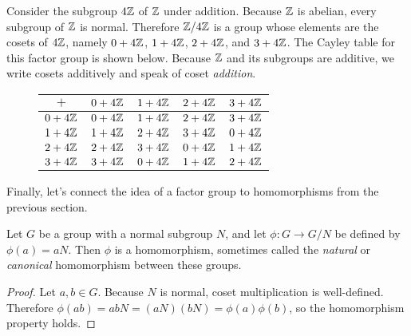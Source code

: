 \begin{example}
Consider the subgroup $4\mathbb{Z}$ of $\mathbb{Z}$ under addition. Because $\mathbb{Z}$ is abelian, every subgroup of $\mathbb{Z}$ is normal. Therefore $\mathbb{Z}/4\mathbb{Z}$ is a group whose elements are the cosets of $4\mathbb{Z}$, namely $0+4\mathbb{Z}$, $1+4\mathbb{Z}$, $2+4\mathbb{Z}$, and $3+4\mathbb{Z}$. The Cayley table for this factor group is shown below. Because $\mathbb{Z}$ and its subgroups are additive, we write cosets additively and speak of coset \textit{addition}.

\begin{figure}[ht]
\centering
\begin{tabular}{c | c c c c}
    $+$     & $0+4\mathbb{Z}$ & $1+4\mathbb{Z}$ & $2+4\mathbb{Z}$ & $3+4\mathbb{Z}$ \\
    \hline
    $0+4\mathbb{Z}$ & $0+4\mathbb{Z}$ & $1+4\mathbb{Z}$ & $2+4\mathbb{Z}$ & $3+4\mathbb{Z}$ \\
    $1+4\mathbb{Z}$ & $1+4\mathbb{Z}$ & $2+4\mathbb{Z}$ & $3+4\mathbb{Z}$ & $0+4\mathbb{Z}$ \\
    $2+4\mathbb{Z}$ & $2+4\mathbb{Z}$ & $3+4\mathbb{Z}$ & $0+4\mathbb{Z}$ & $1+4\mathbb{Z}$ \\
    $3+4\mathbb{Z}$ & $3+4\mathbb{Z}$ & $0+4\mathbb{Z}$ & $1+4\mathbb{Z}$ & $2+4\mathbb{Z}$
\end{tabular}
\caption{}
\end{figure}
\end{example}

Finally, let's connect the idea of a factor group to homomorphisms from the previous section.

\begin{theorem}
Let $G$ be a group with a normal subgroup $N$, and let $\phi: G \to G/N$ be defined by $\phi(a) = aN$. Then $\phi$ is a homomorphism, sometimes called the \textit{natural} or \textit{canonical} homomorphism between these groups.
\end{theorem}

\begin{proof}
Let $a, b \in G$. Because $N$ is normal, coset multiplication is well-defined. Therefore $\phi(ab) = abN = (aN)(bN) = \phi(a)\phi(b)$, so the homomorphism property holds.
\end{proof}